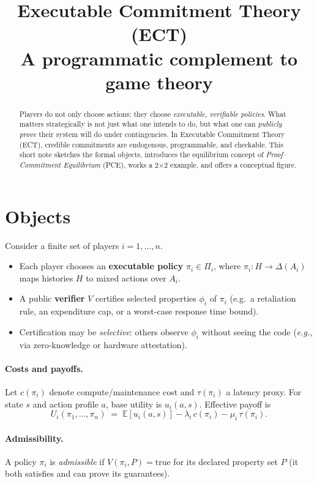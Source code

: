 \documentclass[11pt]{article}
\title{\textbf{Executable Commitment Theory (ECT)}\\\large A programmatic complement to game theory}
\date{} %
\author{} %
\newcommand{\E}{\mathbb{E}}
\newcommand{\A}{A}
\newcommand{\Hhist}{H}
\newcommand{\PPi}{\Pi}
\newcommand{\DeltaD}{\Delta}
\newcommand{\Ui}{U_i}
\newcommand{\ui}{u_i}
\begin{document}
\maketitle

\begin{abstract}
Players do not only choose actions; they choose \emph{executable, verifiable policies}. What matters strategically is not just what one intends to do, but what one can \emph{publicly prove} their system will do under contingencies. In Executable Commitment Theory (ECT), credible commitments are endogenous, programmable, and checkable. This short note sketches the formal objects, introduces the equilibrium concept of \emph{Proof--Commitment Equilibrium} (PCE), works a 2$\times$2 example, and offers a conceptual figure.
\end{abstract}

\section*{Objects}
Consider a finite set of players $i=1,\dots,n$.
\begin{itemize}[leftmargin=1.2em]
  \item Each player chooses an \textbf{executable policy} $\pi_i \in \PPi_i$, where $\pi_i:\Hhist \to \DeltaD(\A_i)$ maps histories $\Hhist$ to mixed actions over $A_i$.
  \item A public \textbf{verifier} $V$ certifies selected properties $\phi_i$ of $\pi_i$ (e.g.\ a retaliation rule, an expenditure cap, or a worst-case response time bound).
  \item Certification may be \emph{selective}: others observe $\phi_i$ without seeing the code (\emph{e.g.}, via zero-knowledge or hardware attestation).
\end{itemize}

\paragraph{Costs and payoffs.}
Let $c(\pi_i)$ denote compute/maintenance cost and $\tau(\pi_i)$ a latency proxy. For state $s$ and action profile $a$, base utility is $\ui(a,s)$. Effective payoff is
\begin{equation}
  \Ui(\pi_1,\ldots,\pi_n)
  \;=\; \E[\ui(a,s)] - \lambda_i\, c(\pi_i) - \mu_i\, \tau(\pi_i).
\end{equation}

\paragraph{Admissibility.}
A policy $\pi_i$ is \emph{admissible} if $V(\pi_i,P)=\text{true}$ for its declared property set $P$ (it both satisfies and can prove its guarantees).
\end{document}
